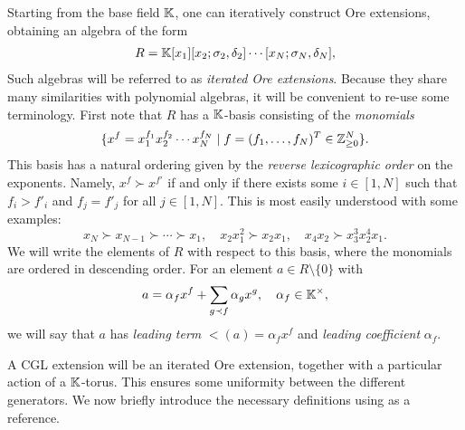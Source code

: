 Starting from the base field $\mathbb{K}$, one can iteratively construct Ore extensions,
obtaining an algebra of the form
\begin{align*}
	R = \mathbb{K}[x_1][x_2; \sigma_2, \delta_2]\cdots[x_N; \sigma_N, \delta_N],
\end{align*}
%
Such algebras will be referred to as \emph{iterated Ore extensions}. Because they share many similarities with polynomial algebras, it
will be convenient to re-use some terminology. First note that $R$ has a $\mathbb{K}$-basis
consisting of the \emph{monomials}
\begin{equation*}
	\{x^f = x_1^{f_1}x_2^{f_2}\cdots x_N^{f_N} \mid f = (f_1, \dots, f_N)^T \in \mathbb{Z}_{\geq 0}^N\}.
\end{equation*}
%
This basis has a natural ordering given by the \emph{reverse lexicographic
	order} on the exponents. Namely, $x^f \succ x^{f'}$
if and only if there exists some $i \in [1, N]$ such that $f_i > f'_i$ and $f_j = f'_j$
for all $j \in [1, N]$. This is most easily understood with some examples:
\begin{equation*}
	x_N \succ x_{N-1} \succ \cdots \succ x_1, \quad x_2x_1^2 \succ x_2 x_1, \quad x_4x_2 \succ x_3^3 x_2^4 x_1.
\end{equation*}
%
We will write the elements of $R$ with respect to this basis, where the monomials are
ordered in descending order. For an element $a \in R \setminus \{0\}$ with
\begin{equation*}
	a = \alpha_f x^f + \sum_{g \prec f} \alpha_g x^g, \quad \alpha_f \in \mathbb{K}^\times,
\end{equation*}
%
we will say that $a$ has \emph{leading term} $\lt(a) = \alpha_f
	x^f$ and \emph{leading coefficient}
$\alpha_f$.

A CGL extension will be an iterated Ore extension, together with a particular action of
a $\mathbb{K}$-torus. This ensures some uniformity between the different generators. We now
briefly introduce the necessary definitions using \cite{GoodearlBrown2002LecturesAQC}
as a reference.


